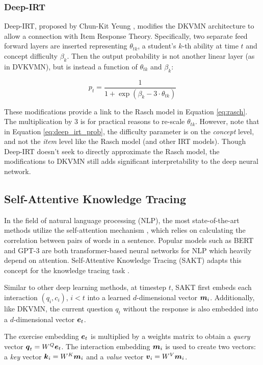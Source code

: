 \subsubsection{Deep-IRT}
Deep-IRT, proposed by Chun-Kit Yeung \cite{yeung_2019}, modifies the DKVMN architecture to allow a connection with Item Response Theory. Specifically, two separate feed forward layers are inserted representing $\theta_{tk}$, a student's $k$-th ability at time $t$ and concept difficulty $\beta_k$. Then the output probability is not another linear layer (as in DVKVMN), but is instead a function of $\theta_{tk}$ and $\beta_k$:

\begin{equation}
  p_t = \frac{1}{1 + \exp\left( \beta_k - 3\cdot \theta_{tk} \right)}
  \label{eq:deep_irt_prob}
\end{equation}

These modifications provide a link to the Rasch model in Equation \ref{eq:rasch}. The multiplication by 3 is for practical reasons to re-scale $\theta_{tk}$. However, note that in Equation \ref{eq:deep_irt_prob}, the difficulty parameter is on the \textit{concept} level, and not the \textit{item} level like the Rasch model (and other IRT models). Though Deep-IRT doesn't seek to directly approximate the Rasch model, the modifications to DKVMN still adds significant interpretability to the deep neural network.


\subsection{Self-Attentive Knowledge Tracing}\label{sec:sakt}
In the field of natural language processing (NLP), the most state-of-the-art methods utilize the self-attention mechanism \cite{vaswani2017}, which relies on calculating the correlation between pairs of words in a sentence. Popular models such as BERT \cite{bert} and GPT-3 \cite{gpt3} are both transformer-based neural networks for NLP which heavily depend on attention. Self-Attentive Knowledge Tracing (SAKT) adapts this concept for the knowledge tracing task \cite{pandey2019}. 

Similar to other deep learning methods, at timestep $t$, SAKT first embeds each interaction $(q_i, c_i)$, $i<t$ into a learned $d$-dimensional vector $\boldsymbol{m}_i$. Additionally, like DKVMN, the current question $q_t$ without the response is also embedded into a $d$-dimensional vector $\boldsymbol{e}_t$. 

The exercise embedding $\boldsymbol{e}_t$ is multiplied by a weights matrix to obtain a \textit{query} vector $\boldsymbol{q}_t = W^{Q} \boldsymbol{e}_t$. The interaction embedding $\boldsymbol{m}_i$ is used to create two vectors: a \textit{key} vector $\boldsymbol{k}_i = W^{K} \boldsymbol{m}_i$ and a \textit{value} vector $\boldsymbol{v}_i = W^V \boldsymbol{m}_i$. 

